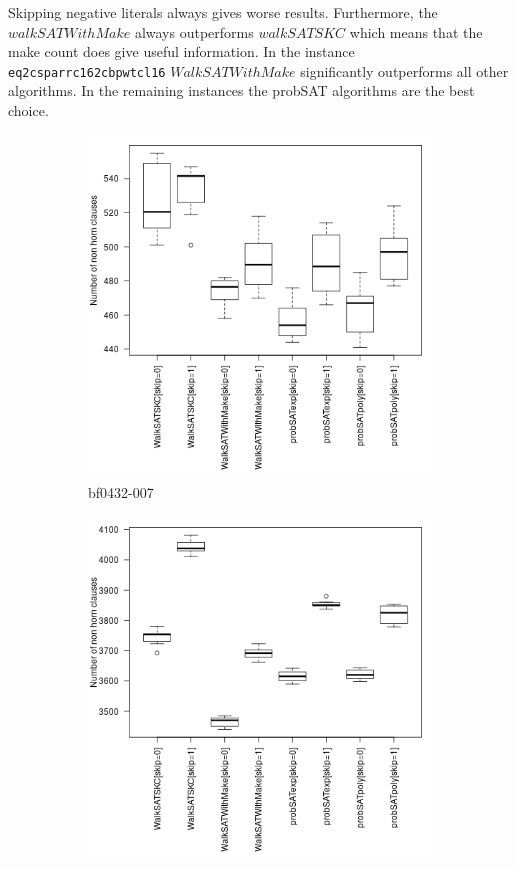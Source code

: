 \documentclass[12pt,a4paper]{article}
\begin{document}
Skipping negative literals always gives worse results. Furthermore, the $walkSATWithMake$ always outperforms $walkSATSKC$ which means that the make count does give useful information. In the instance \texttt{eq2csparrc162cbpwtcl16} $WalkSATWithMake$ significantly outperforms all other algorithms. In the remaining instances the probSAT algorithms are the best choice.
\begin{figure}[H]
  \centering
  \begin{subfigure}{0.4\textwidth}
    \includegraphics[width=\textwidth]{boxplots/boxPlotbf0432-007.png}
    \caption{bf0432-007}
  \end{subfigure}
  \begin{subfigure}{0.4\textwidth}
    \includegraphics[width=\textwidth]{boxplots/boxPloteq2csparrc162cbpwtcl16.png}

\end{subfigure}
\end{figure}
\end{document}
